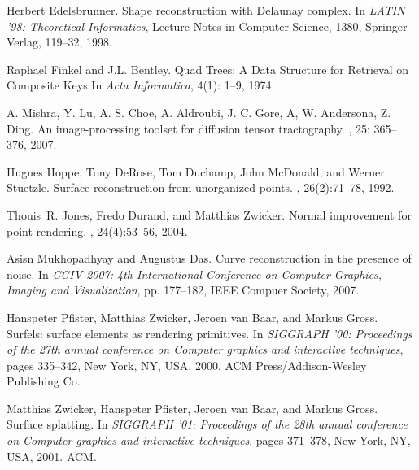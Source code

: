 \documentclass{article}
\numberwithin{cntr}{section}
\numberwithin{equation}{section}
\begin{document}
\begin{thebibliography}{99}
Herbert Edelsbrunner.
\newblock Shape reconstruction with Delaunay complex.
\newblock In {\em LATIN '98: Theoretical Informatics}, Lecture Notes
in Computer Science, 1380, Springer-Verlag, 119--32, 1998.

Raphael Finkel and J.L. Bentley.
\newblock Quad Trees: A Data Structure for Retrieval on Composite Keys
\newblock In {\em Acta Informatica}, 4(1): 1--9, 1974. 

A. Mishra, Y. Lu, A. S. Choe, A. Aldroubi, J. C. Gore,
A, W. Andersona, Z. Ding.
\newblock An image-processing toolset for diffusion tensor tractography.
, 25: 365--376, 2007.

Hugues Hoppe, Tony DeRose, Tom Duchamp, John McDonald, and Werner Stuetzle.
\newblock Surface reconstruction from unorganized points.
, 26(2):71--78, 1992.

Thouis~R. Jones, Fredo Durand, and Matthias Zwicker.
\newblock Normal improvement for point rendering.
, 24(4):53--56, 2004.

Asisn Mukhopadhyay and Augustus Das.
\newblock Curve reconstruction in the presence of noise.
\newblock In {\em CGIV 2007: 4th International Conference on
Computer Graphics, Imaging and Visualization}, pp. 177--182,
IEEE Compuer Society, 2007.

Hanspeter Pfister, Matthias Zwicker, Jeroen van Baar, and Markus Gross.
\newblock Surfels: surface elements as rendering primitives.
\newblock In {\em SIGGRAPH '00: Proceedings of the 27th annual conference on
  Computer graphics and interactive techniques}, pages 335--342, New York, NY,
  USA, 2000. ACM Press/Addison-Wesley Publishing Co.

Matthias Zwicker, Hanspeter Pfister, Jeroen van Baar, and Markus Gross.
\newblock Surface splatting.
\newblock In {\em SIGGRAPH '01: Proceedings of the 28th annual conference on
  Computer graphics and interactive techniques}, pages 371--378, New York, NY,
  USA, 2001. ACM.

\end{thebibliography}
\end{document}
